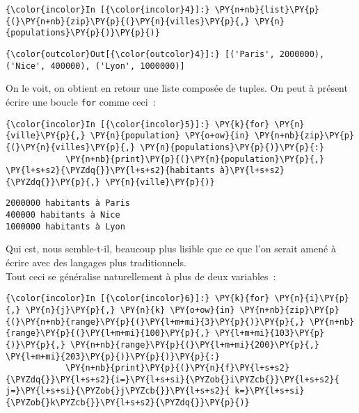     \begin{Verbatim}[commandchars=\\\{\}]
{\color{incolor}In [{\color{incolor}4}]:} \PY{n+nb}{list}\PY{p}{(}\PY{n+nb}{zip}\PY{p}{(}\PY{n}{villes}\PY{p}{,} \PY{n}{populations}\PY{p}{)}\PY{p}{)}
\end{Verbatim}


\begin{Verbatim}[commandchars=\\\{\}]
{\color{outcolor}Out[{\color{outcolor}4}]:} [('Paris', 2000000), ('Nice', 400000), ('Lyon', 1000000)]
\end{Verbatim}
            
    On le voit, on obtient en retour une liste composée de tuples. On peut à
présent écrire une boucle \texttt{for} comme ceci~:

    \begin{Verbatim}[commandchars=\\\{\}]
{\color{incolor}In [{\color{incolor}5}]:} \PY{k}{for} \PY{n}{ville}\PY{p}{,} \PY{n}{population} \PY{o+ow}{in} \PY{n+nb}{zip}\PY{p}{(}\PY{n}{villes}\PY{p}{,} \PY{n}{populations}\PY{p}{)}\PY{p}{:}
            \PY{n+nb}{print}\PY{p}{(}\PY{n}{population}\PY{p}{,} \PY{l+s+s2}{\PYZdq{}}\PY{l+s+s2}{habitants à}\PY{l+s+s2}{\PYZdq{}}\PY{p}{,} \PY{n}{ville}\PY{p}{)}
\end{Verbatim}


    \begin{Verbatim}[commandchars=\\\{\}]
2000000 habitants à Paris
400000 habitants à Nice
1000000 habitants à Lyon

    \end{Verbatim}

    Qui est, nous semble-t-il, beaucoup plus lisible que ce que l'on serait
amené à écrire avec des langages plus traditionnels.\\

Tout ceci se généralise naturellement à plus de deux variables~:

    \begin{Verbatim}[commandchars=\\\{\}]
{\color{incolor}In [{\color{incolor}6}]:} \PY{k}{for} \PY{n}{i}\PY{p}{,} \PY{n}{j}\PY{p}{,} \PY{n}{k} \PY{o+ow}{in} \PY{n+nb}{zip}\PY{p}{(}\PY{n+nb}{range}\PY{p}{(}\PY{l+m+mi}{3}\PY{p}{)}\PY{p}{,} \PY{n+nb}{range}\PY{p}{(}\PY{l+m+mi}{100}\PY{p}{,} \PY{l+m+mi}{103}\PY{p}{)}\PY{p}{,} \PY{n+nb}{range}\PY{p}{(}\PY{l+m+mi}{200}\PY{p}{,} \PY{l+m+mi}{203}\PY{p}{)}\PY{p}{)}\PY{p}{:}
            \PY{n+nb}{print}\PY{p}{(}\PY{n}{f}\PY{l+s+s2}{\PYZdq{}}\PY{l+s+s2}{i=}\PY{l+s+si}{\PYZob{}i\PYZcb{}}\PY{l+s+s2}{ j=}\PY{l+s+si}{\PYZob{}j\PYZcb{}}\PY{l+s+s2}{ k=}\PY{l+s+si}{\PYZob{}k\PYZcb{}}\PY{l+s+s2}{\PYZdq{}}\PY{p}{)}
\end{Verbatim}


